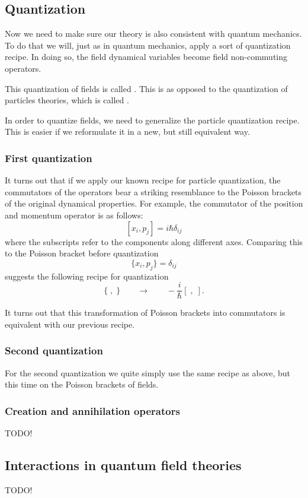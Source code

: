 \subsection{Quantization}
Now we need to make sure our theory is also consistent with quantum mechanics. To do that we will, just as in quantum mechanics, apply a sort of quantization recipe. In doing so, the field dynamical variables become field non-commuting operators.

This quantization of fields is called . This is as opposed to the quantization of particles theories, which is called .

In order to quantize fields, we need to generalize the particle quantization recipe. This is easier if we reformulate it in a new, but still equivalent way.

\subsubsection{First quantization}
It turns out that if we apply our known recipe for particle quantization, the commutators of the operators bear a striking resemblance to the Poisson brackets of the original dynamical properties. For example, the commutator of the position and momentum operator is as follows:
\[ [x_i, p_j] = i \hbar \delta_{ij} \]
where the subscripts refer to the components along different axes. Comparing this to the Poisson bracket before quantization
\[ \{x_i, p_j\} = \delta_{ij} \]
suggests the following recipe for quantization
\[ \{\;,\;\} \qquad \to \qquad - \frac{i}{\hbar}[\;,\;]. \]

It turns out that this transformation of Poisson brackets into commutators is equivalent with our previous recipe.

\subsubsection{Second quantization}
For the second quantization we quite simply use the same recipe as above, but this time on the Poisson brackets of fields.

\subsubsection{Creation and annihilation operators}
TODO!

\subsection{Interactions in quantum field theories}
TODO!

